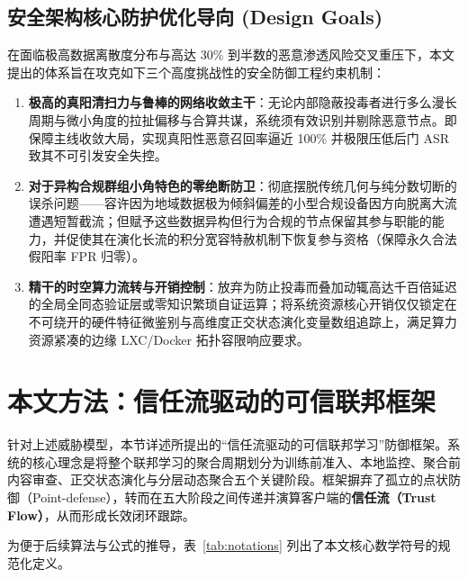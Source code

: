 \documentclass[runningheads]{llncs}
\begin{document}
\subsection{安全架构核心防护优化导向 (Design Goals)}
在面临极高数据离散度分布与高达 30\% 到半数的恶意渗透风险交叉重压下，本文提出的体系旨在攻克如下三个高度挑战性的安全防御工程约束机制：
\begin{enumerate}
    \item \textbf{极高的真阳清扫力与鲁棒的网络收敛主干}：无论内部隐蔽投毒者进行多么漫长周期与微小角度的拉扯偏移与合算共谋，系统须有效识别并剔除恶意节点。即保障主线收敛大局，实现真阳性恶意召回率逼近 100\% 并极限压低后门 ASR 致其不可引发安全失控。
    \item \textbf{对于异构合规群组小角特色的零绝断防卫}：彻底摆脱传统几何与纯分数切断的误杀问题——容许因为地域数据极为倾斜偏差的小型合规设备因方向脱离大流遭遇短暂截流；但赋予这些数据异构但行为合规的节点保留其参与职能的能力，并促使其在演化长流的积分宽容特赦机制下恢复参与资格（保障永久合法假阳率 FPR 归零）。
    \item \textbf{精干的时空算力流转与开销控制}：放弃为防止投毒而叠加动辄高达千百倍延迟的全局全同态验证层或零知识繁琐自证运算；将系统资源核心开销仅仅锁定在不可绕开的硬件特征微鉴别与高维度正交状态演化变量数组追踪上，满足算力资源紧凑的边缘 LXC/Docker 拓扑容限响应要求。
\end{enumerate}


\section{本文方法：信任流驱动的可信联邦框架}

针对上述威胁模型，本节详述所提出的“信任流驱动的可信联邦学习”防御框架。系统的核心理念是将整个联邦学习的聚合周期划分为训练前准入、本地监控、聚合前内容审查、正交状态演化与分层动态聚合五个关键阶段。框架摒弃了孤立的点状防御（Point-defense），转而在五大阶段之间传递并演算客户端的\textbf{信任流（Trust Flow）}，从而形成长效闭环跟踪。

为便于后续算法与公式的推导，表~\ref{tab:notations} 列出了本文核心数学符号的规范化定义。
\end{document}
